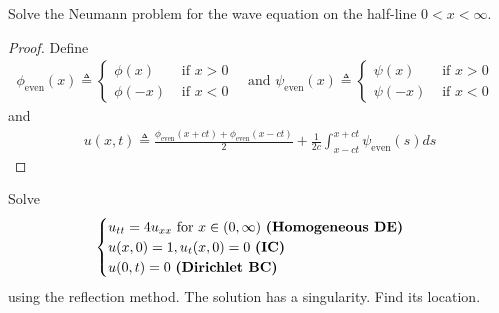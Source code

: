 \documentclass{report}
\begin{document}
\begin{question}{}{}
Solve the Neumann problem for the wave equation on the half-line $0<x<\infty$. 
\end{question}
\begin{proof}
Define 
\begin{align*}
\phi_{\operatorname{even}}(x)\triangleq \begin{cases}
  \phi (x)& \text{ if $x>0$ }\\
  \phi (-x)& \text{ if $x<0$ }
\end{cases}\text{ and }\psi_{\operatorname{even}}(x)\triangleq \begin{cases}
  \psi (x)& \text{ if $x>0$ }\\
  \psi (-x)& \text{ if $x<0$ }
\end{cases}
\end{align*}
and 
\begin{align*}
u(x,t)\triangleq \frac{\phi_{\operatorname{even}} (x+ct)+\phi_{\operatorname{even}}(x-ct)}{2}+ \frac{1}{2c}\int^{x+ct}_{x-ct}\psi_{\operatorname{even}}(s)ds
\end{align*}
\end{proof}
\begin{question}{}{}
Solve 
\begin{align*}
\begin{cases}
  u_{tt}=4u_{xx}\text{ for }x\in (0,\infty)\text{ \textbf{(Homogeneous DE)} }\\
  u(x,0)=1,u_t(x,0)=0\text{ \textbf{(IC)} }\\
  u(0,t)=0\text{ \textbf{(Dirichlet BC)} }
\end{cases}
\end{align*}
using the reflection method. The solution has a singularity. Find its location. 
\end{question}
\end{document}
